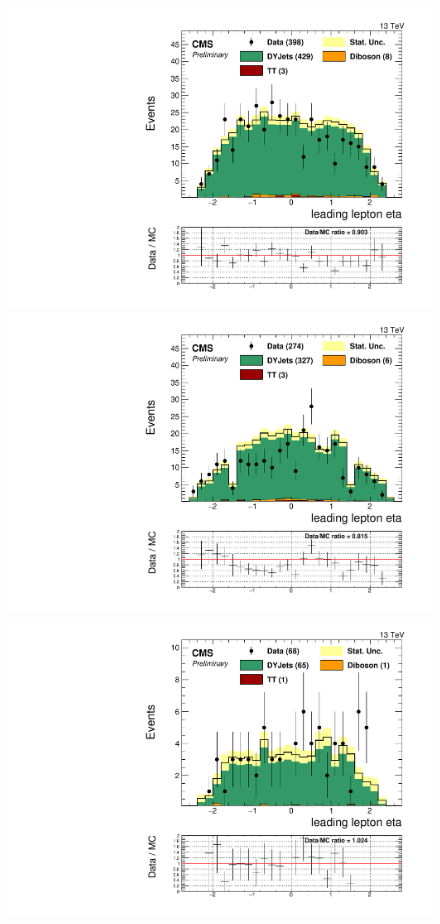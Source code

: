 \begin{figure}[h]
\begin{center}
\includegraphics[scale=0.37]{figures/control/etalep1MLP.pdf}
\includegraphics[scale=0.37]{figures/control/etalep1ELP.pdf}\\[2cm]
\includegraphics[scale=0.37]{figures/control/etalep1MHP.pdf}

\end{center}
\end{figure}
